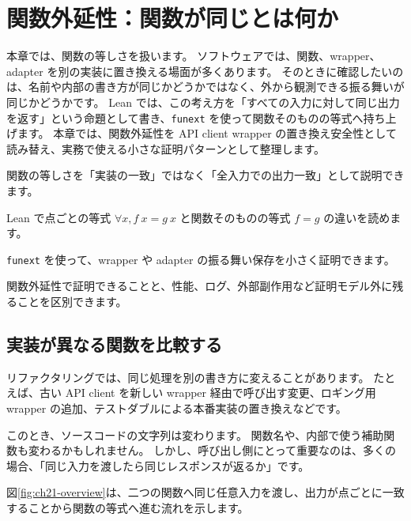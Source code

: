 \chapter{関数外延性：関数が同じとは何か}
\label{chap:function-extensionality}

\begin{chapterabstract}
本章では、関数の等しさを扱います。
ソフトウェアでは、関数、wrapper、adapter を別の実装に置き換える場面が多くあります。
そのときに確認したいのは、名前や内部の書き方が同じかどうかではなく、外から観測できる振る舞いが同じかどうかです。
Lean では、この考え方を「すべての入力に対して同じ出力を返す」という命題として書き、\texttt{funext} を使って関数そのものの等式へ持ち上げます。
本章では、関数外延性を API client wrapper の置き換え安全性として読み替え、実務で使える小さな証明パターンとして整理します。
\end{chapterabstract}

\begin{learninggoals}
\item 関数の等しさを「実装の一致」ではなく「全入力での出力一致」として説明できます。
\item Lean で点ごとの等式 \(\forall x, f\ x = g\ x\) と関数そのものの等式 \(f = g\) の違いを読めます。
\item \texttt{funext} を使って、wrapper や adapter の振る舞い保存を小さく証明できます。
\item 関数外延性で証明できることと、性能、ログ、外部副作用など証明モデル外に残ることを区別できます。
\end{learninggoals}

\section{実装が異なる関数を比較する}

リファクタリングでは、同じ処理を別の書き方に変えることがあります。
たとえば、古い API client を新しい wrapper 経由で呼び出す変更、ロギング用 wrapper の追加、テストダブルによる本番実装の置き換えなどです。

このとき、ソースコードの文字列は変わります。
関数名や、内部で使う補助関数も変わるかもしれません。
しかし、呼び出し側にとって重要なのは、多くの場合、「同じ入力を渡したら同じレスポンスが返るか」です。

図\ref{fig:ch21-overview}は、二つの関数へ同じ任意入力を渡し、出力が点ごとに一致することから関数の等式へ進む流れを示します。

